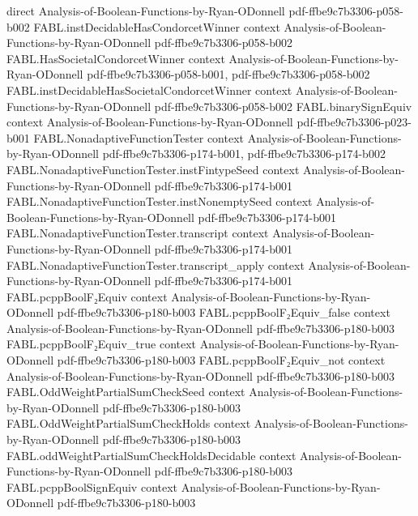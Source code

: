 \begin{theorem}
  {direct}
  {Analysis-of-Boolean-Functions-by-Ryan-ODonnell}
  {pdf-ffbe9c7b3306-p058-b002}
\proofstep
  {FABL.instDecidableHasCondorcetWinner}
  {context}
  {Analysis-of-Boolean-Functions-by-Ryan-ODonnell}
  {pdf-ffbe9c7b3306-p058-b002}
\proofstep
  {FABL.HasSocietalCondorcetWinner}
  {context}
  {Analysis-of-Boolean-Functions-by-Ryan-ODonnell}
  {pdf-ffbe9c7b3306-p058-b001,
    pdf-ffbe9c7b3306-p058-b002}
\proofstep
  {FABL.instDecidableHasSocietalCondorcetWinner}
  {context}
  {Analysis-of-Boolean-Functions-by-Ryan-ODonnell}
  {pdf-ffbe9c7b3306-p058-b002}
\proofstep
  {FABL.binarySignEquiv}
  {context}
  {Analysis-of-Boolean-Functions-by-Ryan-ODonnell}
  {pdf-ffbe9c7b3306-p023-b001}
\proofstep
  {FABL.NonadaptiveFunctionTester}
  {context}
  {Analysis-of-Boolean-Functions-by-Ryan-ODonnell}
  {pdf-ffbe9c7b3306-p174-b001,
    pdf-ffbe9c7b3306-p174-b002}
\proofstep
  {FABL.NonadaptiveFunctionTester.instFintypeSeed}
  {context}
  {Analysis-of-Boolean-Functions-by-Ryan-ODonnell}
  {pdf-ffbe9c7b3306-p174-b001}
\proofstep
  {FABL.NonadaptiveFunctionTester.instNonemptySeed}
  {context}
  {Analysis-of-Boolean-Functions-by-Ryan-ODonnell}
  {pdf-ffbe9c7b3306-p174-b001}
\proofstep
  {FABL.NonadaptiveFunctionTester.transcript}
  {context}
  {Analysis-of-Boolean-Functions-by-Ryan-ODonnell}
  {pdf-ffbe9c7b3306-p174-b001}
\proofstep
  {FABL.NonadaptiveFunctionTester.transcript_apply}
  {context}
  {Analysis-of-Boolean-Functions-by-Ryan-ODonnell}
  {pdf-ffbe9c7b3306-p174-b001}
\proofstep
  {FABL.pcppBoolF₂Equiv}
  {context}
  {Analysis-of-Boolean-Functions-by-Ryan-ODonnell}
  {pdf-ffbe9c7b3306-p180-b003}
\proofstep
  {FABL.pcppBoolF₂Equiv_false}
  {context}
  {Analysis-of-Boolean-Functions-by-Ryan-ODonnell}
  {pdf-ffbe9c7b3306-p180-b003}
\proofstep
  {FABL.pcppBoolF₂Equiv_true}
  {context}
  {Analysis-of-Boolean-Functions-by-Ryan-ODonnell}
  {pdf-ffbe9c7b3306-p180-b003}
\proofstep
  {FABL.pcppBoolF₂Equiv_not}
  {context}
  {Analysis-of-Boolean-Functions-by-Ryan-ODonnell}
  {pdf-ffbe9c7b3306-p180-b003}
\proofstep
  {FABL.OddWeightPartialSumCheckSeed}
  {context}
  {Analysis-of-Boolean-Functions-by-Ryan-ODonnell}
  {pdf-ffbe9c7b3306-p180-b003}
\proofstep
  {FABL.OddWeightPartialSumCheckHolds}
  {context}
  {Analysis-of-Boolean-Functions-by-Ryan-ODonnell}
  {pdf-ffbe9c7b3306-p180-b003}
\proofstep
  {FABL.oddWeightPartialSumCheckHoldsDecidable}
  {context}
  {Analysis-of-Boolean-Functions-by-Ryan-ODonnell}
  {pdf-ffbe9c7b3306-p180-b003}
\proofstep
  {FABL.pcppBoolSignEquiv}
  {context}
  {Analysis-of-Boolean-Functions-by-Ryan-ODonnell}
  {pdf-ffbe9c7b3306-p180-b003}
\proofstep

\end{theorem}
